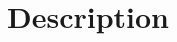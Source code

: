 \documentclass{article}
\author{Varun Khare, GSSS Rao}
\date{March 2017 }
\author{Varun Khare}
\date{Feburary 2017 }
\author{Group}
\date{Feburary 2017 }
\begin{document}
\maketitle
\section{Description}
\end{document}
